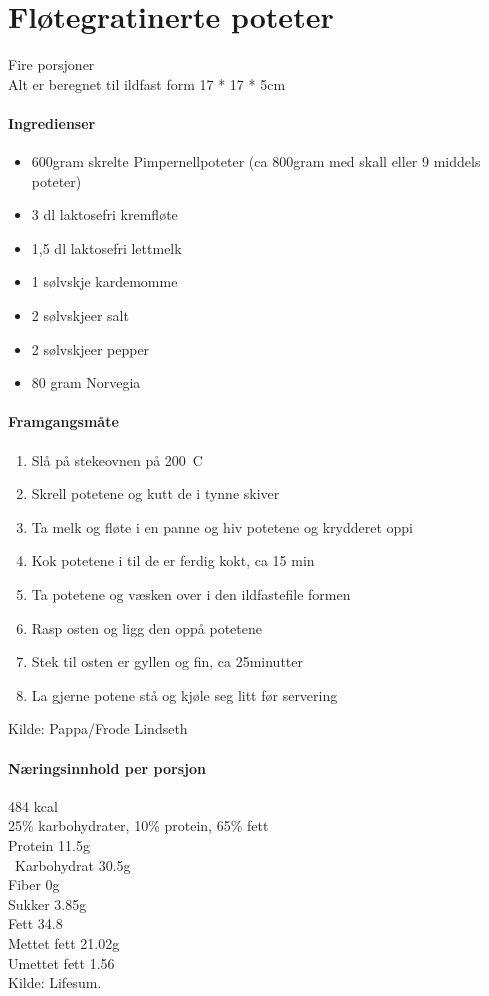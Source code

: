 \section{Fløtegratinerte poteter}
\label{flotegratinerte}
Fire porsjoner\\
Alt er beregnet til ildfast form 17 * 17 * 5cm

\paragraph{Ingredienser}
\begin{itemize}[noitemsep]
  \item 600gram skrelte Pimpernellpoteter (ca 800gram med skall eller 9 middels poteter)
  \item	3 dl laktosefri kremfløte
  \item 1,5 dl laktosefri lettmelk
  \item 1 sølvskje kardemomme
  \item 2 sølvskjeer salt
  \item 2 sølvskjeer pepper
  \item 80 gram Norvegia
\end{itemize}

\paragraph{Framgangsmåte}
\begin{enumerate}[noitemsep]
  \item Slå på stekeovnen på 200\degree~C
  \item Skrell potetene og kutt de i tynne skiver
  \item Ta melk og fløte i en panne og hiv potetene og krydderet oppi
  \item Kok potetene i til de er ferdig kokt, ca 15 min
  \item Ta potetene og væsken over i den ildfastefile formen
  \item Rasp osten og ligg den oppå potetene
  \item Stek til osten er gyllen og fin, ca 25minutter
  \item La gjerne potene stå og kjøle seg litt før servering
\end{enumerate}

Kilde: Pappa/Frode Lindseth\\


\paragraph{Næringsinnhold per porsjon}
484 kcal\\
25\% karbohydrater, 10\% protein, 65\% fett\\
Protein 11.5g\\\
Karbohydrat 30.5g\\
Fiber 0g\\
Sukker 3.85g\\
Fett 34.8\\
Mettet fett 21.02g\\
Umettet fett 1.56\\
Kilde: Lifesum.
